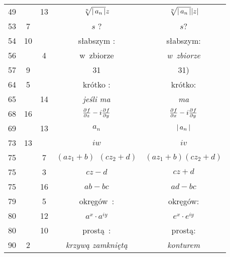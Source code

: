 \documentclass[a4paper,11pt]{article}
\begin{document}
\begin{center}
\begin{tabular}{|c|c|c|c|c|}
    49  & & 13 & $\sqrt[n]{ \left| \,  a_{ n }  \, \right| } z$
           & $\sqrt[n]{ \left| \,  a_{ n }  \, \right| } | z |$ \\
    53  &  7 & & $s$ ? & $s$? \\
    54  & 10 & & słabszym : & słabszym: \\
    56  & &  4 & w~zbiorze & \emph{w~zbiorze} \\
    57  &  9 & & 31 & 31) \\
    64  &  5 & & krótko : & krótko: \\
    65  & & 14 & \emph{jeśli ma} & \emph{ma} \\
    68  & 16 & & $\frac{ \partial^{  } {  f  } }{ \partial {  z  }^{  } } - i \frac{ \partial^{  } {  f  } }{ \partial {  y  }^{  } }$
           & $\frac{ \partial^{  } {  f  } }{ \partial {  x  }^{  } } - i \frac{ \partial^{  } {  f  } }{ \partial {  y  }^{  } }$ \\
    69  & & 13 & $a_{ n }$ & $\left| \,  a_{ n }  \, \right|$ \\
    73  & 13 & & $iw$ & $iv$ \\
    75  & &  7 & $( a z_{ 1 } + b )\;\, ( c z_{ 2 } + d )$
           & $( a z_{ 1 } + b ) ( c z_{ 2 } + d )$ \\
    75  & &  3 & $c z - d$ & $c z + d$ \\
    75  & & 16 & $ab - bc$ & $ad - bc$ \\
    79  & &  5 & okręgów~: & okręgów: \\
    80  & & 12 & $a^{ x } \cdot a^{ iy }$ & $e^{ x } \cdot e^{ iy }$ \\
    80  & & 10 & prostą~: & prostą: \\
    90  &  2 & & \emph{krzywą zamkniętą} & \emph{konturem} \\
    \hline
  \end{tabular}


\end{center}
\end{document}
